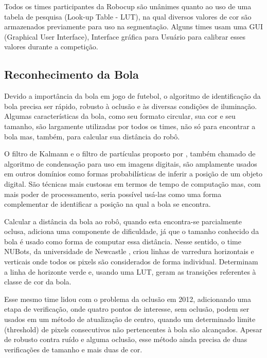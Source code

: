 Todos os times participantes da Robocup são unânimes quanto ao uso de uma tabela de pesquisa (Look-up Table - LUT), na qual diversos valores de cor são armazenados previamente para uso na segmentação. Alguns times usam uma GUI (Graphical User Interface), Interface gráfica para Usuário para calibrar esses valores durante a competição.

\subsection{Reconhecimento da Bola}

Devido a importância da bola em jogo de futebol, o algoritmo de identificação da bola precisa ser rápido, robusto à oclusão e às diversas condições de iluminação. Algumas características da bola, como seu formato circular, sua cor e seu tamanho, são largamente utilizadas por todos os times, não só para encontrar a bola mas, também, para calcular sua distância do robô. 


O filtro de Kalmann \cite{Kalmman} e o filtro de partículas proposto por , também chamado de algoritmo de condensação  \cite{Condensation} para uso em imagens digitais, são amplamente usados em outros domínios como formas probabilísticas de inferir a posição de um objeto digital. São técnicas mais custosas em termos de tempo de computação mas, com mais poder de processamento, seria possível usá-las como uma forma complementar de identificar a posição na qual a bola se encontra.
 
Calcular a distância da bola ao robô, quando esta encontra-se parcialmente oclusa, adiciona uma componente de dificuldade, já que o tamanho conhecido da bola é usado como forma de computar essa distância. Nesse sentido, o time NUBots, da universidade de Newcastle \cite{Bunden}, criou linhas de varredura horizontais e verticais onde todos os pixels são considerados de forma individual. Determinam a linha de horizonte verde e, usando uma LUT, geram as transições referentes à classe de cor da bola. 

Esse mesmo time lidou com o problema da oclusão em 2012, adicionando uma etapa de verificação, onde quatro pontos de interesse, sem oclusão, podem ser usados em um método de atualização de centro, quando um determinado limite (threshold) de pixels consecutivos não pertencentes à bola são alcançados. Apesar de robusto contra ruído e alguma oclusão, esse método ainda precisa de duas verificações de tamanho e mais duas de cor. 


